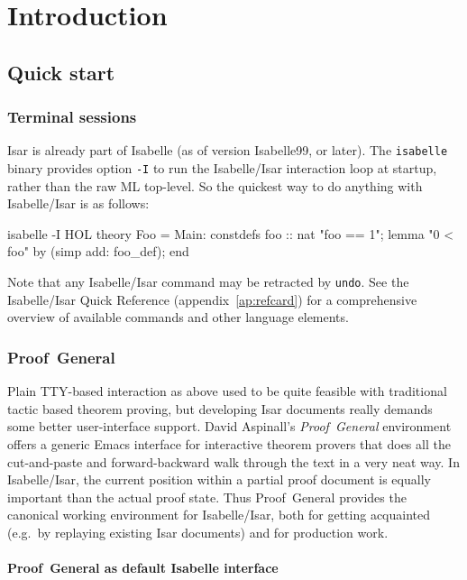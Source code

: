 
\chapter{Introduction}

\section{Quick start}

\subsection{Terminal sessions}

Isar is already part of Isabelle (as of version Isabelle99, or later).  The
\texttt{isabelle} binary provides option \texttt{-I} to run the Isabelle/Isar
interaction loop at startup, rather than the raw ML top-level.  So the
quickest way to do anything with Isabelle/Isar is as follows:
\begin{ttbox}
isabelle -I HOL\medskip
{}\medskip
theory Foo = Main:
constdefs foo :: nat  "foo == 1";
lemma "0 < foo" by (simp add: foo_def);
end
\end{ttbox}
Note that any Isabelle/Isar command may be retracted by \texttt{undo}.  See
the Isabelle/Isar Quick Reference (appendix~\ref{ap:refcard}) for a
comprehensive overview of available commands and other language elements.


\subsection{Proof~General}

Plain TTY-based interaction as above used to be quite feasible with
traditional tactic based theorem proving, but developing Isar documents really
demands some better user-interface support.  David Aspinall's
\emph{Proof~General} environment
\cite{proofgeneral,Aspinall:TACAS:2000} offers a generic Emacs interface for
interactive theorem provers that does all the cut-and-paste and
forward-backward walk through the text in a very neat way.  In Isabelle/Isar,
the current position within a partial proof document is equally important than
the actual proof state.  Thus Proof~General provides the canonical working
environment for Isabelle/Isar, both for getting acquainted (e.g.\ by replaying
existing Isar documents) and for production work.


\subsubsection{Proof~General as default Isabelle interface}

